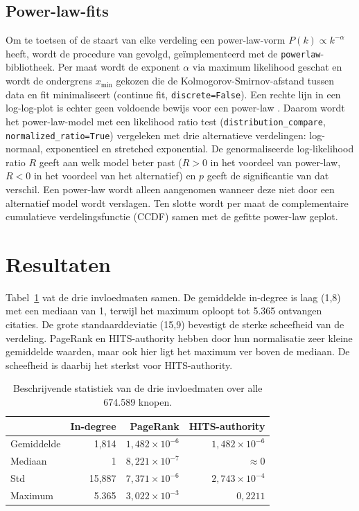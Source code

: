 \documentclass[a4paper, 12pt]{report}
\begin{document}
\subsection{Power-law-fits} Om te toetsen of de staart van elke verdeling een power-law-vorm $P(k) \propto k^{-\alpha}$ heeft, wordt de procedure van \textcite{clauset2009} gevolgd, ge\"implementeerd met de \texttt{powerlaw}-bibliotheek. Per maat wordt de exponent $\alpha$ via maximum likelihood geschat en wordt de ondergrens $x_{\min}$ gekozen die de Kolmogorov-Smirnov-afstand tussen data en fit minimaliseert (continue fit, \texttt{discrete=False}). Een rechte lijn in een log-log-plot is echter geen voldoende bewijs voor een power-law \parencite{broido2019}. Daarom wordt het power-law-model met een likelihood ratio test (\texttt{distribution\_compare}, \texttt{normalized\_ratio=True}) vergeleken met drie alternatieve verdelingen: log-normaal, exponentieel en stretched exponential. De genormaliseerde log-likelihood ratio $R$ geeft aan welk model beter past ($R > 0$ in het voordeel van power-law, $R < 0$ in het voordeel van het alternatief) en $p$ geeft de significantie van dat verschil. Een power-law wordt alleen aangenomen wanneer deze niet door een alternatief model wordt verslagen. Ten slotte wordt per maat de complementaire cumulatieve verdelingsfunctie (CCDF) samen met de gefitte power-law geplot.


\section{Resultaten}
Tabel~\ref{tab:dv2-describe} vat de drie invloedmaten samen. De gemiddelde in-degree is laag (1,8) met een mediaan van 1, terwijl het maximum oploopt tot 5.365 ontvangen citaties. De grote standaarddeviatie (15,9) bevestigt de sterke scheefheid van de verdeling. PageRank en HITS-authority hebben door hun normalisatie zeer kleine gemiddelde waarden, maar ook hier ligt het maximum ver boven de mediaan. De scheefheid is daarbij het sterkst voor HITS-authority.


\begin{table}[ht]
  \centering
  \caption{Beschrijvende statistiek van de drie invloedmaten over alle 674.589 knopen.}
  \label{tab:dv2-describe}
  \begin{tabular}{lrrr}
    \toprule
     & In-degree & PageRank & HITS-authority \\
    \midrule
    Gemiddelde & 1,814            & $1{,}482\times10^{-6}$ & $1{,}482\times10^{-6}$ \\
    Mediaan    & 1                & $8{,}221\times10^{-7}$ & $\approx 0$ \\
    Std        & 15,887           & $7{,}371\times10^{-6}$ & $2{,}743\times10^{-4}$ \\
    Maximum    & 5.365            & $3{,}022\times10^{-3}$ & $0{,}2211$ \\
    \bottomrule
  \end{tabular}
\end{table}
\end{document}
